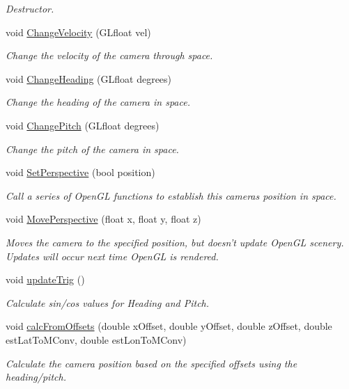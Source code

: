 \begin{DoxyCompactItemize}
\begin{DoxyCompactList}\small\item\em Destructor. \end{DoxyCompactList}\item 
void \hyperlink{classgl_camera_a4affefbc0e15ca7747c4fb25790350ea}{ChangeVelocity} (GLfloat vel)
\begin{DoxyCompactList}\small\item\em Change the velocity of the camera through space. \end{DoxyCompactList}\item 
void \hyperlink{classgl_camera_af2961305265249b76e770fd7d309af8a}{ChangeHeading} (GLfloat degrees)
\begin{DoxyCompactList}\small\item\em Change the heading of the camera in space. \end{DoxyCompactList}\item 
void \hyperlink{classgl_camera_aa5472308ca342ae6c69d44065b1b7123}{ChangePitch} (GLfloat degrees)
\begin{DoxyCompactList}\small\item\em Change the pitch of the camera in space. \end{DoxyCompactList}\item 
void \hyperlink{classgl_camera_a012f9ac34e8f19f9410443eb897f056b}{SetPerspective} (bool position)
\begin{DoxyCompactList}\small\item\em Call a series of OpenGL functions to establish this cameras position in space. \end{DoxyCompactList}\item 
void \hyperlink{classgl_camera_aa04b3632c93a048b700997a24178bbeb}{MovePerspective} (float x, float y, float z)
\begin{DoxyCompactList}\small\item\em Moves the camera to the specified position, but doesn't update OpenGL scenery. Updates will occur next time OpenGL is rendered. \end{DoxyCompactList}\item 
void \hyperlink{classgl_camera_ae9b316dc3ba9b63e3b1e536556a91b8e}{updateTrig} ()
\begin{DoxyCompactList}\small\item\em Calculate sin/cos values for Heading and Pitch. \end{DoxyCompactList}\item 
void \hyperlink{classgl_camera_a2eba229c45cd313c3cf411ecc6cb4625}{calcFromOffsets} (double xOffset, double yOffset, double zOffset, double estLatToMConv, double estLonToMConv)
\begin{DoxyCompactList}\small\item\em Calculate the camera position based on the specified offsets using the heading/pitch. \end{DoxyCompactList}\end{DoxyCompactItemize}
